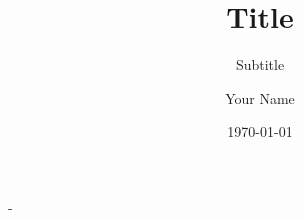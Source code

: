 \documentclass[final,12pt]{beamer}
\title[Short title]{Title}
\subtitle{Subtitle}
\author[Your Name]{Your Name}
\institute[AM FAU]{Applied Mathematics, FAU Erlangen--Nürnberg}
\date{\today}
\begin{document}
\begin{frame}[t]{-}{}

\end{frame}
\end{document}
